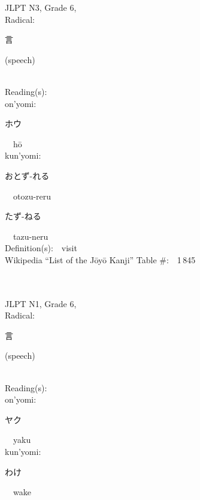 \begin{multicols}{2}
{JLPT N3, Grade 6, \\Radical:\ \ {\begin{CJK}{UTF8}{min} 言 \end{CJK}} (speech) } \\
Reading(s):\ \ \\
{\hspace*{1em}}on'yomi:\ \ \\
{\hspace*{2em}}{\begin{CJK}{UTF8}{min} ホウ \end{CJK}}\ \ h\=o\ \ \\
{\hspace*{1em}}kun'yomi:\ \ \\
{\hspace*{2em}}{\begin{CJK}{UTF8}{min} おとず-れる \end{CJK}}\ \ otozu-reru\ \ \\
{\hspace*{2em}}{\begin{CJK}{UTF8}{min} たず-ねる \end{CJK}}\ \ tazu-neru\ \ \\
Definition(s):\ \ visit \\
Wikipedia ``List of the J\=oy\=o Kanji'' Table \#:\ \ 1\,845 \\
\ \ \\
{\fontsize{34pt}{40pt}  }\ \ \\  %
{JLPT N1, Grade 6, \\Radical:\ \ {\begin{CJK}{UTF8}{min} 言 \end{CJK}} (speech) } \\
Reading(s):\ \ \\
{\hspace*{1em}}on'yomi:\ \ \\
{\hspace*{2em}}{\begin{CJK}{UTF8}{min} ヤク \end{CJK}}\ \ yaku\ \ \\
{\hspace*{1em}}kun'yomi:\ \ \\
{\hspace*{2em}}{\begin{CJK}{UTF8}{min} わけ \end{CJK}}\ \ wake\ \ \\

\end{multicols}
